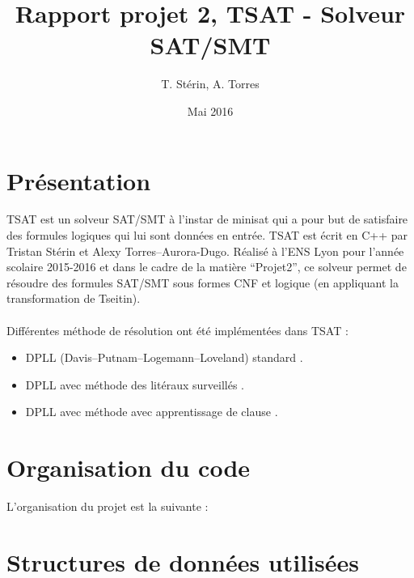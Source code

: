 \documentclass{article}
\title{Rapport projet 2, TSAT - Solveur SAT/SMT}
\author{T. Stérin, A. Torres}
\date{Mai 2016}
\newcommand{\litt}{\alpha}
\newcommand{\non}[1]{\overline{#1}}
\begin{document}
\maketitle

\section{Présentation}
TSAT est un solveur SAT/SMT à l'instar de minisat \cite{minisat} qui a pour but de satisfaire des formules logiques qui lui sont données en entrée.
TSAT est écrit en C++ par Tristan Stérin et Alexy Torres--Aurora-Dugo.
Réalisé à l'ENS Lyon pour l'année scolaire 2015-2016 et dans le cadre de la matière ``Projet2'', ce solveur permet de résoudre des formules SAT/SMT sous formes CNF et logique (en appliquant la transformation de Tseitin).
\\ \\
Différentes méthode de résolution ont été implémentées dans TSAT : 
\begin{itemize}
	\item DPLL (Davis–Putnam–Logemann–Loveland) standard \cite{DPLL}.
	\item DPLL avec méthode des litéraux surveillés \cite{WL}.
	\item DPLL avec méthode avec apprentissage de clause \cite{CL}.
\end{itemize}


\section{Organisation du code}
L'organisation du projet est la suivante :
\section{Structures de données utilisées}
\end{document}
